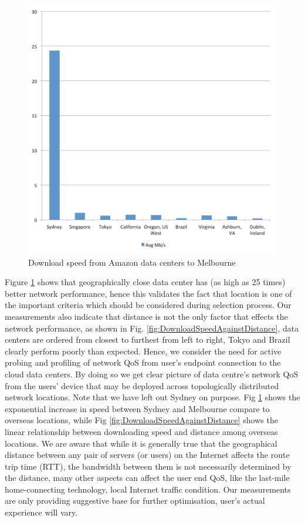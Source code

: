 \begin{figure}[!ht]
 \centering
 \includegraphics[width=\textwidth,keepaspectratio]{Figures/QoS/figure5.pdf}
 \caption{Download speed from Amazon data centers to Melbourne}
\label{fig:DownloadSpeedFromAmazonToMelbourne}
\end{figure}

Figure \ref{fig:DownloadSpeedFromAmazonToMelbourne} shows that geographically close data center has (as high as 25 times) better network performance, hence this validates the fact that location is one of the important criteria which should be considered during selection process. Our measurements also indicate that distance is not the only factor that effects the network performance, as shown in Fig. \ref{fig:DownloadSpeedAgainstDistance}, data centers are ordered from closest to furthest from left to right, Tokyo and Brazil clearly perform poorly than expected. Hence, we consider the need for active probing and profiling of network QoS from user's endpoint connection to the cloud data centers. By doing so we get clear picture of data centre's network QoS from the users' device that may be deployed across topologically distributed network locations. Note that we have left out Sydney on purpose. Fig \ref{fig:DownloadSpeedFromAmazonToMelbourne} shows the exponential increase in speed between Sydney and Melbourne compare to overseas locations, while Fig \ref{fig:DownloadSpeedAgainstDistance} shows the linear relationship between downloading speed and distance among overseas locations. We are aware that while it is generally true that the geographical distance between any pair of servers (or users) on the Internet affects the route trip time (RTT), the bandwidth between them is not necessarily determined by the distance, many other aspects can affect the user end QoS, like the last-mile home-connecting technology, local Internet traffic condition. Our measurements are only providing suggestive base for further optimisation, user's actual experience will vary.


